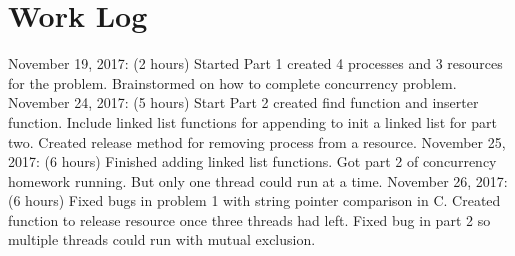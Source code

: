\documentclass{article}
\begin{document}
\section*{Work Log}
November 19, 2017: (2 hours) Started Part 1 created 4 processes and 3 resources for the problem. Brainstormed on how to complete concurrency problem. \newline
November 24, 2017: (5 hours) Start Part 2 created find function and inserter function. Include linked list functions for appending to init a linked list for part two. Created release method for removing process from a resource. \newline
November 25, 2017: (6 hours) Finished adding linked list functions. Got part 2 of concurrency homework running. But only one thread could run at a time. \newline
November 26, 2017: (6 hours) Fixed bugs in problem 1 with string pointer comparison in C. Created function to release resource once three threads had left. Fixed bug in part 2 so multiple threads could run with mutual exclusion.
\end{document}
